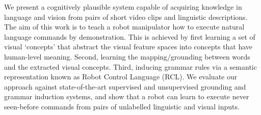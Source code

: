 We present a cognitively plausible system capable of acquiring knowledge in language and vision from pairs of short video clips and linguistic descriptions. The aim of this work is to teach a robot manipulator how to execute natural language commands by demonstration. This is achieved by first learning a set of visual `concepts' that abstract the visual feature spaces into concepts that have human-level meaning. Second, learning the mapping/grounding between words and the extracted visual concepts. Third, inducing grammar rules via a semantic representation known as Robot Control Language (RCL). We evaluate our approach against state-of-the-art supervised and unsupervised grounding and grammar induction systems, and show that a robot can learn to execute never seen-before commands from pairs of unlabelled linguistic and visual inputs.

